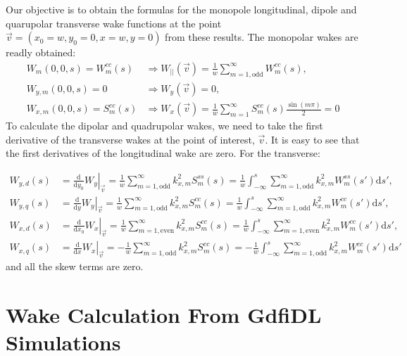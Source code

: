 Our objective is to obtain the formulas for the monopole longitudinal, dipole and quarupolar transverse wake functions at the point $\vec{v} = (x_0=w,y_0=0,x=w,y=0)$ from these results. The monopolar wakes are readly obtained:
\begin{align}
W_m(0,0,s) = W^{cc}_m(s) &\Rightarrow W_{||}(\vec{v}) = \frac1w\sum^\infty_{m=1,\mathrm{odd}} W^{cc}_m(s), \\
W_{y,m}(0,0,s) = 0 &\Rightarrow W_y(\vec{v}) = 0, \\
W_{x,m}(0,0,s) = S^{cc}_m(s) &\Rightarrow W_x(\vec{v}) = \frac1w\sum^\infty_{m=1} S^{cc}_m(s)\frac{\sin(m\pi)}{2} = 0
\end{align}
To calculate the dipolar and quadrupolar wakes, we need to take the first derivative of the transverse wakes at the point of interest, $\vec{v}$. It is easy to see that the first derivatives of the longitudinal wake are zero. For the transverse:

\begin{align}
W_{y,d}(s) &= \left.\frac{\mathrm{d}}{\mathrm{d}y_0}W_y\right|_{\vec{v}} = \frac1w\sum^\infty_{m=1,\mathrm{odd}} k_{x,m}^2 S^{ss}_m(s) = \frac1w\int_{-\infty}^s\sum^\infty_{m=1,\mathrm{odd}} k_{x,m}^2 W^{ss}_m(s') \mathrm{d}s',\\
W_{y,q}(s) &= \left.\frac{\mathrm{d}}{\mathrm{d}y}W_y\right|_{\vec{v}} = \frac1w\sum^\infty_{m=1,\mathrm{odd}} k_{x,m}^2 S^{cc}_m(s) = \frac1w\int_{-\infty}^s\sum^\infty_{m=1,\mathrm{odd}} k_{x,m}^2 W^{cc}_m(s') \mathrm{d}s', \\
W_{x,d}(s) &= \left.\frac{\mathrm{d}}{\mathrm{d}x_0}W_x\right|_{\vec{v}} = \frac1w\sum^\infty_{m=1,\mathrm{even}} k_{x,m}^2 S^{cc}_m(s) = \frac1w\int_{-\infty}^s\sum^\infty_{m=1,\mathrm{even}}k_{x,m}^2 W^{cc}_m(s') \mathrm{d}s', \\
W_{x,q}(s) &= \left.\frac{\mathrm{d}}{\mathrm{d}x}W_x\right|_{\vec{v}} = -\frac1w\sum^\infty_{m=1,\mathrm{odd}} k_{x,m}^2 S^{cc}_m(s) =-\frac1w\int_{-\infty}^s\sum^\infty_{m=1,\mathrm{odd}} k_{x,m}^2 W^{cc}_m(s') \mathrm{d}s'
\end{align}
and all the skew terms are zero.

\section{Wake Calculation From GdfiDL Simulations}


